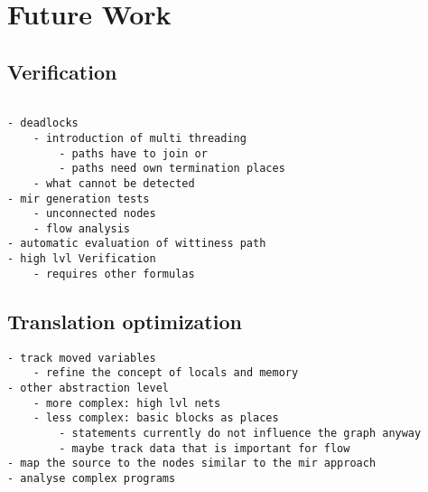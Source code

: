 \chapter{Future Work}
\label{future}
\section{Verification}
\begin{verbatim}
    
- deadlocks
    - introduction of multi threading
        - paths have to join or
        - paths need own termination places
    - what cannot be detected
- mir generation tests
    - unconnected nodes
    - flow analysis
- automatic evaluation of wittiness path 
- high lvl Verification
    - requires other formulas
\end{verbatim}

\section{Translation optimization}
\begin{verbatim}
- track moved variables
    - refine the concept of locals and memory
- other abstraction level
    - more complex: high lvl nets
    - less complex: basic blocks as places
        - statements currently do not influence the graph anyway
        - maybe track data that is important for flow
- map the source to the nodes similar to the mir approach
- analyse complex programs
\end{verbatim}
